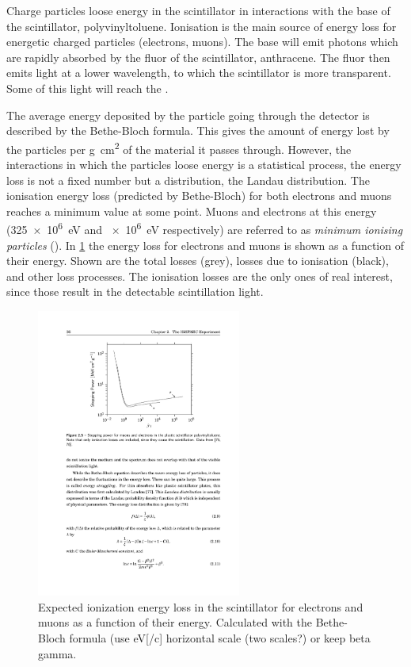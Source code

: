 Charge particles loose energy in the scintillator in interactions with the base of the scintillator, polyvinyltoluene. Ionisation is the main source of energy loss for energetic charged particles (electrons, muons). The base will emit photons which are rapidly absorbed by the fluor of the scintillator, anthracene. The fluor then emits light at a lower wavelength, to which the scintillator is more transparent. Some of this light will reach the \pmt.

The average energy deposited by the particle going through the detector is described by the Bethe-Bloch formula. This gives the amount of energy lost by the particles per \si{\gram\centi\meter\squared} of the material it passes through. However, the interactions in which the particles loose energy is a statistical process, the energy loss is not a fixed number but a distribution, the Landau distribution. The ionisation energy loss (predicted by Bethe-Bloch) for both electrons and muons reaches a minimum value at some point. Muons and electrons at this energy (\SI{325e6}{\eV} and \SI{e6}{\eV} respectively) are referred to as \textit{minimum ionising particles} (\mip). In \cref{fig:bethe-bloch} the energy loss for electrons and muons is shown as a function of their energy. Shown are the total losses (grey), losses due to ionisation (black), and other loss processes. The ionisation losses are the only ones of real interest, since those result in the detectable scintillation light.

\begin{figure}
    \centering
    \includegraphics[width=0.6\textwidth]
                    {plots/experiment/bethe-bloch}
    \caption{Expected ionization energy loss in the scintillator for electrons and muons as a function of their energy. Calculated with the Bethe-Bloch formula (use eV[/c] horizontal scale (two scales?) or keep beta gamma.}
    \label{fig:bethe-bloch}
\end{figure}

